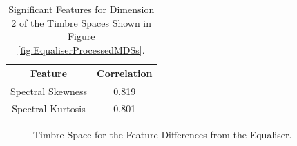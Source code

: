 	\begin{table}[h!]
		\centering
		\begin{tabular}{|c|c|}
			\hline
			\bf{Feature} & \bf{Correlation} \\
			\hline
			\hline
			Spectral Skewness & 0.819 \\
			\hline
			Spectral Kurtosis & 0.801 \\
			\hline
		\end{tabular}
		\caption{Significant Features for Dimension 2 of the Timbre Spaces Shown in Figure 
			 \ref{fig:EqualiserProcessedMDSs}.}
		\label{tab:EqualiserProcessedFeaturesDim2}
	\end{table}

	\begin{figure}[h!]
		\centering
		\qquad
		\caption{Timbre Space for the Feature Differences from the Equaliser.}
		\label{fig:EqualiserDifferenceMDSs}
	\end{figure}

